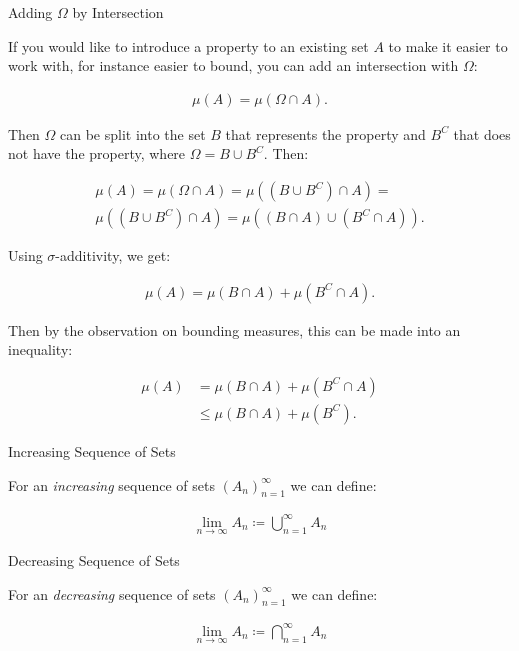 \begin{observation}{}{Adding $\Omega$ by Intersection}

    If you would like to introduce a property to an existing set $A$ to make it easier to work with, for instance easier to bound, you can add an intersection with $\Omega$:

        \begin{align*}
            \mu(A) = \mu(\Omega \cap A).
        \end{align*}

    Then $\Omega$ can be split into the set $B$ that represents the property and $B^C$ that does not have the property, where $\Omega = B \cup B^C$. Then:

        \begin{align*}
            \mu(A) = \mu(\Omega \cap A) = \mu((B \cup B^C) \cap A) = \\
            \mu((B \cup B^C) \cap A) = \mu((B \cap A) \cup (B^C \cap A)).
        \end{align*}

    Using $\sigma$-additivity, we get:

        \begin{align*}
            \mu(A) = \mu(B \cap A) + \mu(B^C \cap A).
        \end{align*}

    Then by the observation on bounding measures, this can be made into an inequality:

        \begin{align*}
            \mu(A) &= \mu(B \cap A) + \mu(B^C \cap A) \\
            &\leq \mu(B \cap A) + \mu(B^C).
        \end{align*}

\end{observation}

\begin{observation}{}{Increasing Sequence of Sets}

    For an \emph{increasing} sequence of sets $(A_n)_{n=1}^{\infty}$ we can define:

        \begin{align*}
            \lim_{n \to \infty} A_n \coloneqq \bigcup_{n=1}^{\infty} A_n
        \end{align*}

\end{observation}

\begin{observation}{}{Decreasing Sequence of Sets}

    For an \emph{decreasing} sequence of sets $(A_n)_{n=1}^{\infty}$ we can define:

        \begin{align*}
            \lim_{n \to \infty} A_n \coloneqq \bigcap_{n=1}^{\infty} A_n
        \end{align*}

\end{observation}


